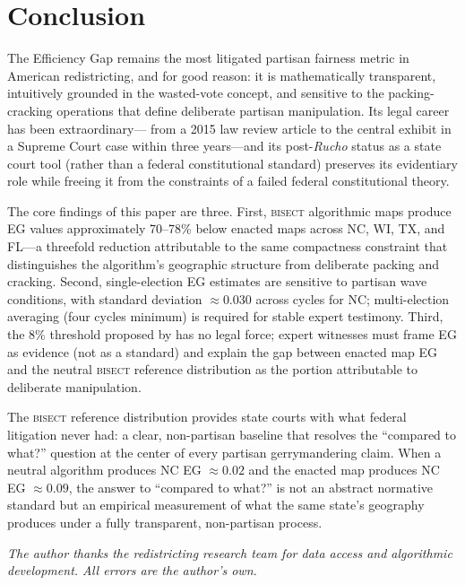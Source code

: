 \section{Conclusion}
\label{sec:conclusion}

The Efficiency Gap remains the most litigated partisan fairness metric in American
redistricting, and for good reason: it is mathematically transparent, intuitively
grounded in the wasted-vote concept, and sensitive to the packing-cracking operations
that define deliberate partisan manipulation. Its legal career has been extraordinary---
from a 2015 law review article to the central exhibit in a Supreme Court case within
three years---and its post-\textit{Rucho} status as a state court tool (rather than
a federal constitutional standard) preserves its evidentiary role while freeing it
from the constraints of a failed federal constitutional theory.

The core findings of this paper are three. First, \textsc{bisect} algorithmic
maps produce EG values approximately 70--78\% below enacted maps across NC, WI,
TX, and FL---a threefold reduction attributable to the same compactness constraint
that distinguishes the algorithm's geographic structure from deliberate packing and
cracking. Second, single-election EG estimates are sensitive to partisan wave
conditions, with standard deviation $\approx 0.030$ across cycles for NC; multi-election
averaging (four cycles minimum) is required for stable expert testimony. Third,
the 8\% threshold proposed by \citet{stephanopoulosMcGhee2015} has no legal force;
expert witnesses must frame EG as evidence (not as a standard) and explain the
gap between enacted map EG and the neutral \textsc{bisect} reference distribution
as the portion attributable to deliberate manipulation.

The \textsc{bisect} reference distribution provides state courts with what federal
litigation never had: a clear, non-partisan baseline that resolves the ``compared
to what?'' question at the center of every partisan gerrymandering claim. When
a neutral algorithm produces NC EG $\approx 0.02$ and the enacted map produces
NC EG $\approx 0.09$, the answer to ``compared to what?'' is not an abstract
normative standard but an empirical measurement of what the same state's geography
produces under a fully transparent, non-partisan process.

\bigskip

\noindent\textit{The author thanks the redistricting research team for data
access and algorithmic development. All errors are the author's own.}
